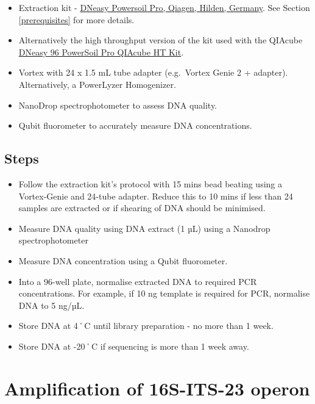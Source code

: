 \documentclass[
]{book}
\providecommand{\tightlist}{%
  \setlength{\itemsep}{0pt}\setlength{\parskip}{0pt}}
\begin{document}
\begin{itemize}
\tightlist
\item
  Extraction kit - \href{https://www.qiagen.com/au/resources/resourcedetail?id=9bb59b74-e493-4aeb-b6c1-f660852e8d97&lang=en}{DNeasy Powersoil Pro, Qiagen, Hilden, Germany}. See Section \ref{prerequisites} for more details.
\item
  Alternatively the high throughput version of the kit used with the QIAcube \href{https://rmiteduau-my.sharepoint.com/personal/christian_krohn_rmit_edu_au/Documents/Experiments/2025_ETPSequencingProject/_\%09https:/www.qiagen.com/au/products/discovery-and-translational-research/dna-rna-purification/dna-purification/microbial-dna/dneasy-96-powersoil-pro-qiacube-ht-kit}{DNeasy 96 PowerSoil Pro QIAcube HT Kit}.
\item
  Vortex with 24 x 1.5 mL tube adapter (e.g.~Vortex Genie 2 + adapter). Alternatively, a PowerLyzer Homogenizer.
\item
  NanoDrop spectrophotometer to assess DNA quality.
\item
  Qubit fluorometer to accurately measure DNA concentrations.
\end{itemize}

\subsection{Steps}\label{steps}

\begin{itemize}
\tightlist
\item
  Follow the extraction kit's protocol with 15 mins bead beating using a Vortex-Genie and 24-tube adapter. Reduce this to 10 mins if less than 24 samples are extracted or if shearing of DNA should be minimised.
\item
  Measure DNA quality using DNA extract (1 µL) using a Nanodrop spectrophotometer
\item
  Measure DNA concentration using a Qubit fluorometer.
\item
  Into a 96-well plate, normalise extracted DNA to required PCR concentrations. For example, if 10 ng template is required for PCR, normalise DNA to 5 ng/µL.
\item
  Store DNA at 4˚C until library preparation - no more than 1 week.
\item
  Store DNA at -20˚C if sequencing is more than 1 week away.
\end{itemize}

\section{Amplification of 16S-ITS-23 operon}\label{amplification-of-16s-its-23-operon}
\end{document}
